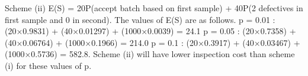 \documentclass[a4paper,12pt]{article}
\begin{document}
\begin{enumerate}
Scheme (ii)
E(S) = 20P(accept batch based on first sample)
+ 40P(2 defectives in first sample and 0 in second).
The values of E(S) are as follows.
p = 0.01 : (20×0.9831) + (40×0.01297) + (1000×0.0039) = 24.1
p = 0.05 : (20×0.7358) + (40×0.06764) + (1000×0.1966) = 214.0
p = 0.1 : (20×0.3917) + (40×0.03467) + (1000×0.5736) = 582.8.
Scheme (ii) will have lower inspection cost than scheme (i) for these values of p.
\end{enumerate}
\end{document}
